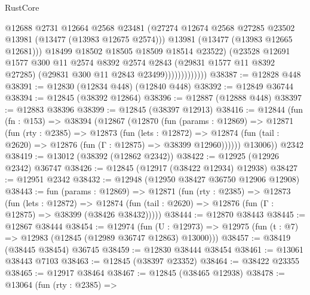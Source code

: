 \begin{lexlean}{RustCore}
\begin{coremodule}
                              @12688
                              @2731
                              @12664
                              @2568
                              @23481
                              (@27274
                                @12674
                                @2568
                                @27285
                                @23502
                                @13981
                                (@13477 (@13983 @12675 @2574)))
                              @13981
                              (@13477 (@13983 @12665 @12681)))
                            @18499
                            @18502
                            @18505
                            @18509
                            @18514
                            @23522)
                          (@23528
                            @12691
                            @1577
                            @300
                            @11
                            @2574
                            @8392
                            @2574
                            @2843
                            (@29831 @1577 @11 @8392 @27285)
                            (@29831 @300 @11 @2843 @23499)))))))))))))
@38387 := @12828 @448
@38391 := @12830 (@12834 @448) (@12840 @448)
@38392 := @12849 @36744
@38394 := @12845 (@38392 @12864)
@38396 := @12887 (@12888 @448)
@38397 := @12883 @38396
@38399 := @12845 (@38397 @12913)
@38416 := @12844
    (fun (fn : @153) =>
    @38394
      (@12867
        (@12870
          (fun (params : @12869) =>
          @12871
            (fun (rty : @2385) =>
            @12873
              (fun (lets : @12872) =>
              @12874 (fun (tail : @2620) => @12876 (fun (Γ : @12875) => @38399 @12960))))))
        @13006))
    @2342
@38419 := @13012 (@38392 (@12862 @2342))
@38422 := @12925 (@12926 @2342) @36747
@38426 := @12845 (@12917 (@38422 @12934) @12938)
@38427 := @12951 @2342
@38432 := @12948 (@12950 @38427 @36750 @12906 @12908)
@38443 := fun (params : @12869) =>
  @12871
    (fun (rty : @2385) =>
    @12873
      (fun (lets : @12872) =>
      @12874 (fun (tail : @2620) => @12876 (fun (Γ : @12875) => @38399 (@38426 @38432)))))
@38444 := @12870 @38443
@38445 := @12867 @38444
@38454 := @12974
    (fun (U : @12973) => @12975 (fun (t : @7) => @12983 (@12845 (@12989 @36747 @12863) @13000)))
@38457 := @38419 (@38445 @38454) @36745
@38459 := @12830 @38444 @38454
@38461 := @13061 @38443 @7103
@38463 := @12845 (@38397 @23352)
@38464 := @38422 @23355
@38465 := @12917 @38464
@38467 := @12845 (@38465 @12938)
@38478 := @13064
    (fun (rty : @2385) =>

\end{coremodule}
\end{lexlean}
